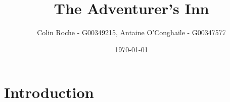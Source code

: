 \documentclass{article}
\title{The Adventurer's Inn}
\author{Colin Roche - G00349215, Antaine O'Conghaile - G00347577 }
\date{\today}
\begin{document}
\maketitle

\section{Introduction}
\end{document}
